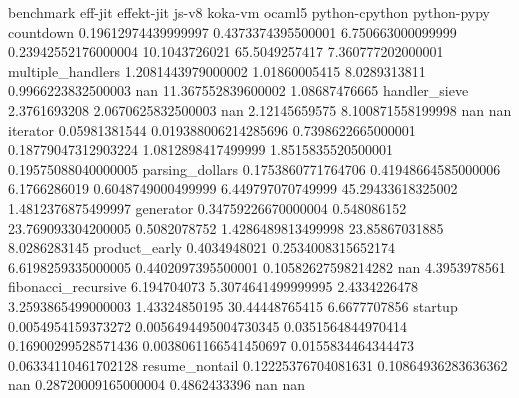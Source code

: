benchmark	eff-jit	effekt-jit	js-v8	koka-vm	ocaml5	python-cpython	python-pypy
countdown	0.19612974439999997	0.4373374395500001	6.750663000099999	0.23942552176000004	10.1043726021	65.5049257417	7.360777202000001
multiple_handlers	1.2081443979000002	1.01860005415	8.0289313811	0.9966223832500003	nan	11.367552839600002	1.08687476665
handler_sieve	2.3761693208	2.0670625832500003	nan	2.12145659575	8.100871558199998	nan	nan
iterator	0.05981381544	0.019388006214285696	0.7398622665000001	0.18779047312903224	1.0812898417499999	1.8515835520500001	0.19575088040000005
parsing_dollars	0.1753860771764706	0.41948664585000006	6.1766286019	0.6048749000499999	6.449797070749999	45.29433618325002	1.4812376875499997
generator	0.34759226670000004	0.548086152	23.769093304200005	0.5082078752	1.4286489813499998	23.85867031885	8.0286283145
product_early	0.4034948021	0.2534008315652174	6.6198259335000005	0.4402097395500001	0.10582627598214282	nan	4.3953978561
fibonacci_recursive	6.194704073	5.3074641499999995	2.4334226478	3.2593865499000003	1.43324850195	30.44448765415	6.6677707856
startup	0.0054954159373272	0.0056494495004730345	0.0351564844970414	0.16900299528571436	0.0038061166541450697	0.0155834464344473	0.06334110461702128
resume_nontail	0.12225376704081631	0.10864936283636362	nan	0.28720009165000004	0.4862433396	nan	nan